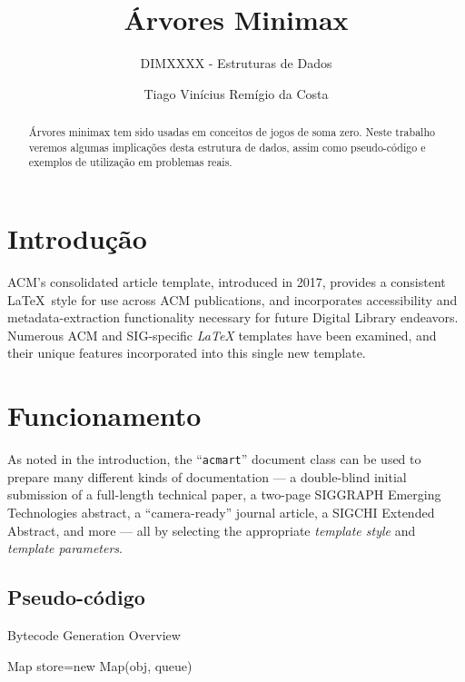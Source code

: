 \documentclass[sigplan,screen]{acmart}
\begin{document}
\title{Árvores Minimax}
\subtitle{DIMXXXX - Estruturas de Dados}

\author{Tiago Vinícius Remígio da Costa}

\begin{abstract}
  Árvores minimax tem sido usadas em conceitos de jogos de soma zero. 
  Neste trabalho veremos algumas implicações desta estrutura de dados, 
  assim como pseudo-código e exemplos de utilização em problemas reais.
\end{abstract}


\maketitle
\pagestyle{plain}

\section{Introdução}
ACM's consolidated article template, introduced in 2017, provides a
consistent \LaTeX\ style for use across ACM publications, and
incorporates accessibility and metadata-extraction functionality
necessary for future Digital Library endeavors. Numerous ACM and
SIG-specific {\itshape LaTeX} templates have been examined, and their unique
features incorporated into this single new template.

\section{Funcionamento}
As noted in the introduction, the ``\verb|acmart|'' document class can
be used to prepare many different kinds of documentation --- a
double-blind initial submission of a full-length technical paper, a
two-page SIGGRAPH Emerging Technologies abstract, a ``camera-ready''
journal article, a SIGCHI Extended Abstract, and more --- all by
selecting the appropriate {\itshape template style} and {\itshape
  template parameters}.

\subsection{Pseudo-código}

\begin{algorithm}
  \caption{Bytecode Generation Overview}
  \label{alg:generator}
  
  Map store=new Map(obj, queue)\;
\end{algorithm}
\end{document}
